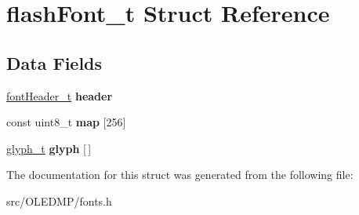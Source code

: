 \hypertarget{structflash_font__t}{}\section{flash\+Font\+\_\+t Struct Reference}
\label{structflash_font__t}
\subsection*{Data Fields}
\begin{DoxyCompactItemize}
\item 
\hyperlink{structfont_header__t}{font\+Header\+\_\+t} {\bfseries header}\hypertarget{structflash_font__t_a6f2f3ddabca36316cf0ded98245705ab}{}\label{structflash_font__t_a6f2f3ddabca36316cf0ded98245705ab}

\item 
const uint8\+\_\+t {\bfseries map} \mbox{[}256\mbox{]}\hypertarget{structflash_font__t_a1e331ffb32634b4fd64ff9f57babd1ed}{}\label{structflash_font__t_a1e331ffb32634b4fd64ff9f57babd1ed}

\item 
\hyperlink{structglyph__t}{glyph\+\_\+t} {\bfseries glyph} \mbox{[}$\,$\mbox{]}\hypertarget{structflash_font__t_a0ea1ff3b6a3c1b7b0fef47d8ffd319ea}{}\label{structflash_font__t_a0ea1ff3b6a3c1b7b0fef47d8ffd319ea}

\end{DoxyCompactItemize}


The documentation for this struct was generated from the following file\+:\begin{DoxyCompactItemize}
\item 
src/\+O\+L\+E\+D\+M\+P/fonts.\+h\end{DoxyCompactItemize}

